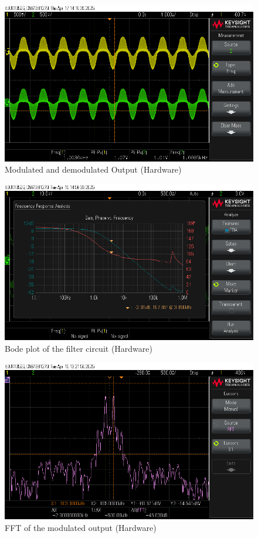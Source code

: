 \documentclass[conference]{IEEEtran}
\begin{document}
\begin{figure}
    \centering
    \includegraphics[width=1\linewidth]{Images/modulated_demodulated.png}
    \caption{Modulated and demodulated Output (Hardware)}
\end{figure}

\begin{figure}
    \centering
    \includegraphics[width=1\linewidth]{Images/filter_response.png}
    \caption{Bode plot of the filter circuit (Hardware)}
\end{figure}

\begin{figure}
    \centering
    \includegraphics[width=1\linewidth]{Images/modulated_output_fft.png}
    \caption{FFT of the modulated output (Hardware)}
\end{figure}
\end{document}
